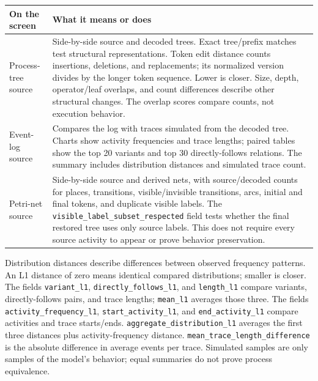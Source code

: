 \documentclass[11pt,a4paper]{article}
\makeatletter
\newcommand{\code}[1]{\nolinkurl{#1}}
\newenvironment{controls}{%
  \small\begin{longtable}{@{}>{\raggedright\arraybackslash}p{.34\linewidth}
    >{\raggedright\arraybackslash}p{.62\linewidth}@{}}
  \toprule\textbf{On the screen} & \textbf{What it means or does}\\\midrule\endhead
  \bottomrule\endfoot
}{\end{longtable}\normalsize}
\makeatother
\begin{document}
\begin{controls}
Process-tree source & Side-by-side source and decoded trees. Exact tree/prefix
matches test structural representations. Token edit distance counts insertions,
deletions, and replacements; its normalized version divides by the longer
token sequence. Lower is closer. Size, depth, operator/leaf overlaps, and count
differences describe other structural changes. The overlap scores compare
counts, not execution behavior.\\
Event-log source & Compares the log with traces simulated from the decoded
tree. Charts show activity frequencies and trace lengths; paired tables show
the top 20 variants and top 30 directly-follows relations. The summary includes
distribution distances and simulated trace count.\\
Petri-net source & Side-by-side source and derived nets, with source/decoded
counts for places, transitions, visible/invisible transitions, arcs, initial
and final tokens, and duplicate visible labels. The
\code{visible_label_subset_respected} field tests whether the final restored
tree uses only source labels. This does not require every source activity to
appear or prove behavior preservation.\\
\end{controls}

Distribution distances describe differences between observed frequency
patterns. An L1 distance of zero means identical compared distributions;
smaller is closer. The fields \code{variant_l1}, \code{directly_follows_l1},
and \code{length_l1} compare variants, directly-follows pairs, and trace
lengths; \code{mean_l1} averages those three. The fields
\code{activity_frequency_l1}, \code{start_activity_l1}, and
\code{end_activity_l1} compare activities and trace starts/ends.
\code{aggregate_distribution_l1} averages the first three distances plus
activity-frequency distance. \code{mean_trace_length_difference} is the
absolute difference in average events per trace. Simulated samples are only
samples of the model's behavior; equal summaries do not prove process
equivalence.
\end{document}
